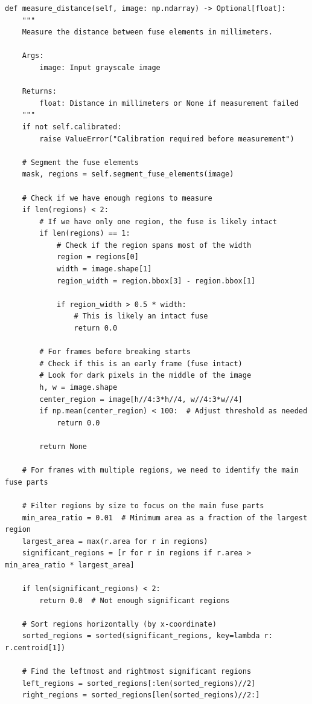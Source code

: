 \documentclass[12pt,a4paper]{article}
\begin{document}
\begin{lstlisting}
def measure_distance(self, image: np.ndarray) -> Optional[float]:
    """
    Measure the distance between fuse elements in millimeters.
    
    Args:
        image: Input grayscale image
        
    Returns:
        float: Distance in millimeters or None if measurement failed
    """
    if not self.calibrated:
        raise ValueError("Calibration required before measurement")
    
    # Segment the fuse elements
    mask, regions = self.segment_fuse_elements(image)
    
    # Check if we have enough regions to measure
    if len(regions) < 2:
        # If we have only one region, the fuse is likely intact
        if len(regions) == 1:
            # Check if the region spans most of the width
            region = regions[0]
            width = image.shape[1]
            region_width = region.bbox[3] - region.bbox[1]
            
            if region_width > 0.5 * width:
                # This is likely an intact fuse
                return 0.0
        
        # For frames before breaking starts
        # Check if this is an early frame (fuse intact)
        # Look for dark pixels in the middle of the image
        h, w = image.shape
        center_region = image[h//4:3*h//4, w//4:3*w//4]
        if np.mean(center_region) < 100:  # Adjust threshold as needed
            return 0.0
            
        return None
    
    # For frames with multiple regions, we need to identify the main fuse parts
    
    # Filter regions by size to focus on the main fuse parts
    min_area_ratio = 0.01  # Minimum area as a fraction of the largest region
    largest_area = max(r.area for r in regions)
    significant_regions = [r for r in regions if r.area > min_area_ratio * largest_area]
    
    if len(significant_regions) < 2:
        return 0.0  # Not enough significant regions
        
    # Sort regions horizontally (by x-coordinate)
    sorted_regions = sorted(significant_regions, key=lambda r: r.centroid[1])
    
    # Find the leftmost and rightmost significant regions
    left_regions = sorted_regions[:len(sorted_regions)//2]
    right_regions = sorted_regions[len(sorted_regions)//2:]
    

\end{lstlisting}
\end{document}
